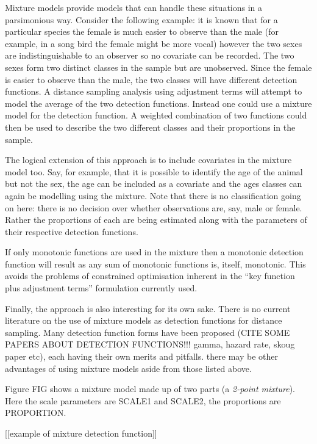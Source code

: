 Mixture models provide models that can handle these situations in a parsimonious way. Consider the following example: it is known that for a particular species the female is much easier to observe than the male (for example, in a song bird the female might be more vocal) however the two sexes are indistinguishable to an observer so no covariate can be recorded. The two sexes form two distinct classes in the sample but are unobserved. Since the female is easier to observe than the male, the two classes will have different detection functions. A distance sampling analysis using adjustment terms will attempt to model the average of the two detection functions. Instead one could use a mixture model for the detection function. A weighted combination of two functions could then be used to describe the two different classes and their proportions in the sample. 

The logical extension of this approach is to include covariates in the mixture model too. Say, for example, that it is possible to identify the age of the animal but not the sex, the age can be included as a covariate and the ages classes can again be modelling using the mixture. Note that there is no classification going on here: there is no decision over whether observations are, say, male or female. Rather the proportions of each are being estimated along with the parameters of their respective detection functions.

If only monotonic functions are used in the mixture then a monotonic detection function will result as any sum of monotonic functions is, itself, monotonic. This avoids the problems of constrained optimisation inherent in the ``key function plus adjustment terms'' formulation currently used.

Finally, the approach is also interesting for its own sake. There is no current literature on the use of mixture models as detection functions for distance sampling. Many detection function forms have been proposed (CITE SOME PAPERS ABOUT DETECTION FUNCTIONS!!! gamma, hazard rate, skoug paper etc), each having their own merits and pitfalls. there may be other advantages of using mixture models aside from those listed above.

Figure FIG shows a mixture model made up of two parts (a \textit{2-point mixture}). Here the scale parameters are SCALE1 and SCALE2, the proportions are PROPORTION.

[[example of mixture detection function]]






